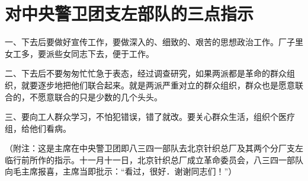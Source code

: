 \section[对中央警卫团支左部队的三点指示（一九六七年六月二十六日）]{对中央警卫团支左部队的三点指示}


一、下去后要做好宣传工作，要做深入的、细致的、艰苦的思想政治工作。厂子里女工多，要派些女同志下去，便于工作。

二、下去后不要匆匆忙忙急于表态，经过调查研究，如果两派都是革命的群众组织，就要逐步地把他们联合起来。就是两派严重对立的群众组织，群众也是愿意联合的，不愿意联合的只是少数的几个头头。

三、要向工人群众学习，不怕犯错误，错了就改。要关心群众生活，组织个医疗组，给他们看病。

（附注：这是主席在中央警卫团即八三四一部队去北京针织总厂及其两个分厂支左临行前所作的指示。十一月十一日，北京针织总厂成立革命委员会，八三四一部队向毛主席报喜，主席当即批示：“看过，很好．谢谢同志们！”）

